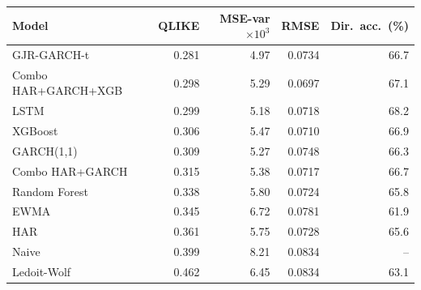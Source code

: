 \begin{tabular}{lrrrr}
\hline
Model & QLIKE & MSE-var$\times10^3$ & RMSE & Dir.\ acc.\ (\%) \\
\hline
GJR-GARCH-t & 0.281 & 4.97 & 0.0734 & 66.7 \\
Combo HAR+GARCH+XGB & 0.298 & 5.29 & 0.0697 & 67.1 \\
LSTM & 0.299 & 5.18 & 0.0718 & 68.2 \\
XGBoost & 0.306 & 5.47 & 0.0710 & 66.9 \\
GARCH(1,1) & 0.309 & 5.27 & 0.0748 & 66.3 \\
Combo HAR+GARCH & 0.315 & 5.38 & 0.0717 & 66.7 \\
Random Forest & 0.338 & 5.80 & 0.0724 & 65.8 \\
EWMA & 0.345 & 6.72 & 0.0781 & 61.9 \\
HAR & 0.361 & 5.75 & 0.0728 & 65.6 \\
Naive & 0.399 & 8.21 & 0.0834 & -- \\
Ledoit-Wolf & 0.462 & 6.45 & 0.0834 & 63.1 \\
\hline
\end{tabular}
